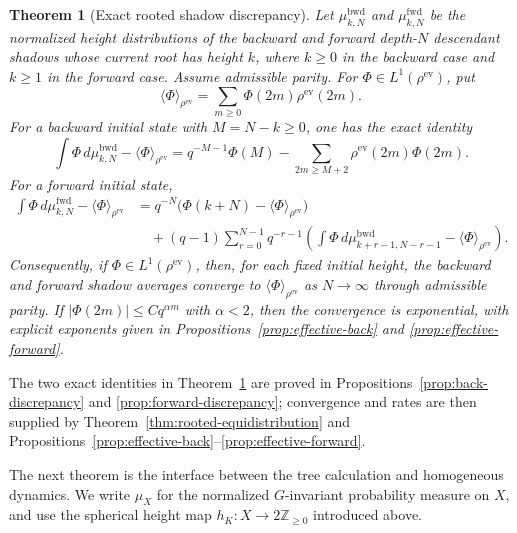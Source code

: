 \documentclass[11pt]{amsart}
\theoremstyle{definition}
\theoremstyle{plain}
\newtheorem{theorem}[definition]{Theorem}
\newcommand{\ZZ}{\mathbb Z}
\newcommand{\fwd}{\mathrm{fwd}}
\newcommand{\bwd}{\mathrm{bwd}}
\newcommand{\ev}{\mathrm{ev}}
\newcommand{\ang}{\langle}
\newcommand{\rang}{\rangle}
\begin{document}
\begin{theorem}[Exact rooted shadow discrepancy]\label{thm:rooted-shadow}
Let \(\mu^{\bwd}_{k,N}\) and \(\mu^{\fwd}_{k,N}\) be the normalized height
distributions of the backward and forward depth-\(N\) descendant shadows whose
current root has height \(k\), where \(k\ge0\) in the backward case and
\(k\ge1\) in the forward case.  Assume admissible parity.  For
\(\Phi\in L^1(\rho^{\ev})\), put
\[
\ang\Phi\rang_{\rho^{\ev}}=\sum_{m\ge0}\Phi(2m)\rho^{\ev}(2m).
\]
For a backward initial state with \(M=N-k\ge0\), one has the exact identity
\begin{equation}\label{eq:intro-back-error}
\int \Phi\,d\mu^{\bwd}_{k,N}-\ang\Phi\rang_{\rho^{\ev}}
 = q^{-M-1}\Phi(M)-\sum_{2m\ge M+2}\rho^{\ev}(2m)\Phi(2m).
\end{equation}
For a forward initial state,
\begin{align}\label{eq:intro-forward-error}
\int \Phi\,d\mu^{\fwd}_{k,N}-\ang\Phi\rang_{\rho^{\ev}}
&=q^{-N}\bigl(\Phi(k+N)-\ang\Phi\rang_{\rho^{\ev}}\bigr)  \\
&\quad +(q-1)\sum_{r=0}^{N-1}q^{-r-1}
   \left(\int \Phi\,d\mu^{\bwd}_{k+r-1,N-r-1}
          -\ang\Phi\rang_{\rho^{\ev}}\right). \nonumber
\end{align}
Consequently, if \(\Phi\in L^1(\rho^{\ev})\), then, for each fixed initial
height, the backward and forward shadow averages converge to
\(\ang\Phi\rang_{\rho^{\ev}}\) as \(N\to\infty\) through admissible parity.
If \(|\Phi(2m)|\le Cq^{\alpha m}\) with \(\alpha<2\), then the convergence is
exponential, with explicit exponents given in
Propositions~\ref{prop:effective-back} and \ref{prop:effective-forward}.
\end{theorem}

The two exact identities in Theorem~\ref{thm:rooted-shadow} are proved in
Propositions~\ref{prop:back-discrepancy} and
\ref{prop:forward-discrepancy}; convergence and rates are then supplied by
Theorem~\ref{thm:rooted-equidistribution} and
Propositions~\ref{prop:effective-back}--\ref{prop:effective-forward}.

The next theorem is the interface between the tree calculation and homogeneous
dynamics.  We write \(\mu_X\) for the normalized \(G\)-invariant probability
measure on \(X\), and use the spherical height map
\(h_K:X\to2\ZZ_{\ge0}\) introduced above.
\end{document}
